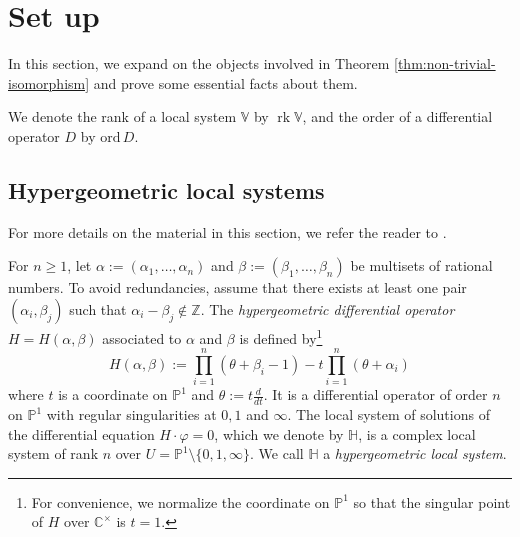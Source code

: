 \documentclass[11pt, reqno]{amsart}
\theoremstyle{plain}
\theoremstyle{definition}
\newcommand{\PP}{\mathbb{P}}
\newcommand{\ZZ}{\mathbb{Z}}
\newcommand{\HH}{\mathbb{H}}
\newcommand{\Ps}{\mathbb{P}}
\newcommand{\Gm}{{\mathbb{C}^\times}}
\DeclareMathOperator{\rk}{rk}
\begin{document}
\section{Set up}
\label{sec:set-up}
In this section, we expand on the objects involved in Theorem \ref{thm:non-trivial-isomorphism} and prove some essential facts about them. 

We denote the rank of a local system $\mathbb{V}$ by $\rk{\mathbb{V}}$, and the order of a differential operator $D$ by $\mathrm{ord}\,D.$

\subsection{Hypergeometric local systems}
\label{sec:hgm-ls}
For more details on the material in this section, we refer the reader to \cite{BH, Katz, RV}.
\smallskip

For $n\ge 1$, let $\alpha:=(\alpha_1,\dots, \alpha_n)$ and $\beta:=(\beta_1,\dots,\beta_n)$ be multisets of rational numbers. To avoid redundancies, assume that there exists at least one pair $(\alpha_i, \beta_j)$ such that $\alpha_i -\beta_j \notin \ZZ$.
The \emph{hypergeometric differential operator} $H=H(\alpha, \beta)$ associated to $\alpha$ and $\beta$ is defined by\footnote{For convenience, we normalize the coordinate on $\Ps^1$ so that the singular point of $H$ over $\Gm$ is $t=1$.}  
\begin{equation}\label{eq:HG-diff-operator}
H(\alpha, \beta):=\prod_{i=1}^n (\theta+\beta_i -1) - t \prod_{i=1}^n (\theta+\alpha_i)
\end{equation}
where $t$ is a coordinate on $\PP^1$ and $\theta:= t\frac{d}{dt}.$
It is a differential operator of order $n$ on $\Ps^1$ with regular singularities at $0,1 $ and $\infty.$
The local system of solutions of the differential equation $H \cdot \varphi =0$, which we denote by $\HH$, is a complex local system of rank $n$ over $U=\PP^1 \setminus \{0,1,\infty\}$. We call $\HH$ a \emph{hypergeometric local system}. 
\end{document}
